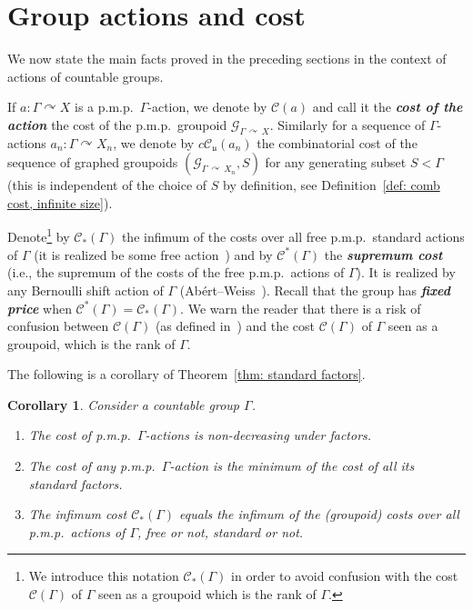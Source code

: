 \documentclass[10pt]{amsart}
\newtheorem{coro}[cdrthm]{Corollary}
\theoremstyle{definition}
\newcommand{\defin}[1]{\textbf{\emph{#1}}}
\newcommand{\acting}{\curvearrowright}
\newcommand{\cost}{\mathcal{C}}
\newcommand{\ccost}{c\mathcal{C}}
\newcommand{\cg}{\mathcal{G}}
\newcommand{\vraicost}{\mathscr{C}}
\newcommand{\ul}{\mathfrak{u}}
\newcommand{\pmp}{p.m.p.\ }
\begin{document}
\section{Group actions and cost}\label{sect: gp act and cost}

We now state the main facts proved in the preceding sections in the context of actions of countable groups.

If $a: \Gamma\acting X$ is a \pmp $\Gamma$-action, we denote by $\cost(a)$ and call it the
\defin{cost of the action} the cost of the \pmp groupoid $\cg_{\Gamma\,\acting\,X}$. Similarly for a sequence of $\Gamma$-actions $a_n:\Gamma\acting X_n$, we denote by $\ccost_\ul(a_n)$ the combinatorial cost of the sequence of graphed groupoids $(\cg_{\Gamma\,\acting\,X_n}, S)$ for any generating subset $S<\Gamma$ (this is independent of the choice of $S$ by definition, see Definition~\ref{def: comb cost, infinite size}).


Denote\footnote{We introduce this notation $\vraicost_{*}(\Gamma)$ in order to avoid confusion with the cost $\cost(\Gamma)$ of $\Gamma$ seen as a groupoid which is the rank of $\Gamma$.} by $\vraicost_*(\Gamma)$ the infimum of the costs over all free \pmp standard actions of $\Gamma$ (it is realized be some free action~\cite[Proposition~VI.21]{Gab-cost}) and by $\vraicost^*(\Gamma)$ the
\defin{supremum cost} (i.e., the supremum of the costs of the free \pmp actions of $\Gamma$). It is realized by any Bernoulli shift action of $\Gamma$ (Abért--Weiss~\cite{Abert-Weiss-2013}). Recall that the group has
\defin{fixed price} when $\vraicost^*(\Gamma)= \vraicost_*(\Gamma)$. We warn the reader that there is a risk of confusion between $\vraicost(\Gamma)$ (as defined in~\cite{Gab-cost}) and the cost $\cost(\Gamma)$ of $\Gamma$ seen as a groupoid, which is the rank of $\Gamma$.

The following is a corollary of Theorem~\ref{thm: standard factors}.

\begin{coro}\label{cor:monotonicitygroup}
Consider a countable group $\Gamma$.
\begin{enumerate}
\item \label{coro4.1.1} The cost of \pmp $\Gamma$-actions is non-decreasing under factors.

\item \label{coro4.1.2}The cost of any \pmp $\Gamma$-action is the minimum of the cost of all its standard factors.

\item \label{coro4.1.3}The infimum cost $\vraicost_{*}(\Gamma)$ equals the infimum of the (groupoid) costs over all \pmp actions of $\Gamma$, free or not, standard or not.
\end{enumerate}
\end{coro}
\end{document}
